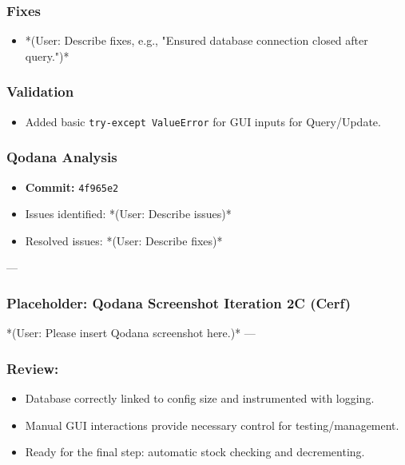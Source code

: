 \subsubsection{Fixes}
\begin{itemize}
	\item *(User: Describe fixes, e.g., "Ensured database connection closed after query.")*
\end{itemize}

\subsubsection{Validation}
\begin{itemize}
	\item Added basic \verb|try-except ValueError| for GUI inputs for Query/Update.
\end{itemize}

\subsubsection{Qodana Analysis}
\begin{itemize}
	\item \textbf{Commit:} \verb|4f965e2|
	\item Issues identified: *(User: Describe issues)*
	\item Resolved issues: *(User: Describe fixes)*
\end{itemize}

--- %
\subsubsection*{Placeholder: Qodana Screenshot Iteration 2C (Cerf)}
*(User: Please insert Qodana screenshot here.)*
---

\subsubsection{Review:}
\begin{itemize}
	\item Database correctly linked to config size and instrumented with logging.
	\item Manual GUI interactions provide necessary control for testing/management.
	\item Ready for the final step: automatic stock checking and decrementing.
\end{itemize}

\newpage

